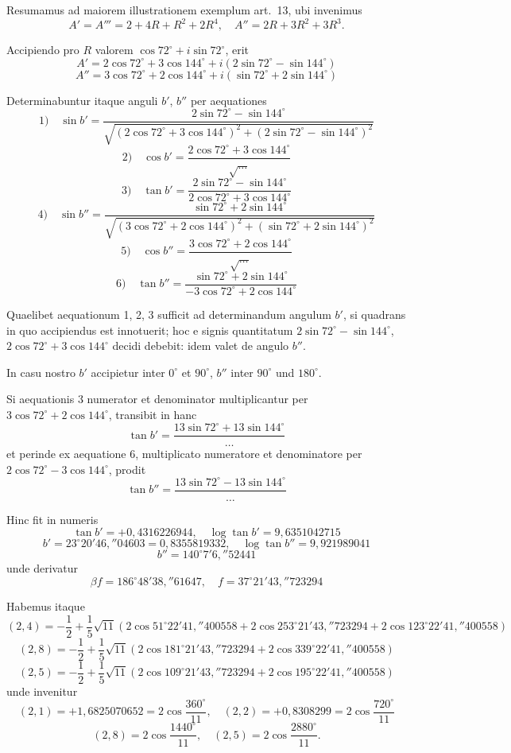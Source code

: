 \documentclass[12pt,a4paper]{article}
\begin{document}
Resumamus ad maiorem illustrationem exemplum art.\ 13, ubi invenimus
\[
A' = A''' = 2 + 4R + R^2 + 2R^4, \quad A'' = 2R + 3R^2 + 3R^3.
\]

Accipiendo pro $R$ valorem $\cos 72^\circ + i\sin 72^\circ$, erit
\[
A' = 2\cos 72^\circ + 3\cos 144^\circ + i(2\sin 72^\circ - \sin 144^\circ)
\]
\[
A'' = 3\cos 72^\circ + 2\cos 144^\circ + i(\sin 72^\circ + 2\sin 144^\circ)
\]

Determinabuntur itaque anguli $b'$, $b''$ per aequationes
\[
1)\quad \sin b' = \frac{2\sin 72^\circ - \sin 144^\circ}{\sqrt{(2\cos 72^\circ + 3\cos 144^\circ)^2 + (2\sin 72^\circ - \sin 144^\circ)^2}}
\]
\[
2)\quad \cos b' = \frac{2\cos 72^\circ + 3\cos 144^\circ}{\sqrt{\ldots}}
\]
\[
3)\quad \tan b' = \frac{2\sin 72^\circ - \sin 144^\circ}{2\cos 72^\circ + 3\cos 144^\circ}
\]
\[
4)\quad \sin b'' = \frac{\sin 72^\circ + 2\sin 144^\circ}{\sqrt{(3\cos 72^\circ + 2\cos 144^\circ)^2 + (\sin 72^\circ + 2\sin 144^\circ)^2}}
\]
\[
5)\quad \cos b'' = \frac{3\cos 72^\circ + 2\cos 144^\circ}{\sqrt{\ldots}}
\]
\[
6)\quad \tan b'' = \frac{\sin 72^\circ + 2\sin 144^\circ}{-3\cos 72^\circ + 2\cos 144^\circ}
\]

Quaelibet aequationum 1, 2, 3 sufficit ad determinandum angulum $b'$, si quadrans in quo accipiendus est innotuerit; hoc e signis quantitatum $2\sin 72^\circ - \sin 144^\circ$, $2\cos 72^\circ + 3\cos 144^\circ$ decidi debebit: idem valet de angulo $b''$.

In casu nostro $b'$ accipietur inter $0^\circ$ et $90^\circ$, $b''$ inter $90^\circ$ und $180^\circ$.

Si aequationis 3 numerator et denominator multiplicantur per $3\cos 72^\circ + 2\cos 144^\circ$, transibit in hanc
\[
\tan b' = \frac{13\sin 72^\circ + 13\sin 144^\circ}{\ldots}
\]
et perinde ex aequatione 6, multiplicato numeratore et denominatore per $2\cos 72^\circ - 3\cos 144^\circ$, prodit
\[
\tan b'' = \frac{13\sin 72^\circ - 13\sin 144^\circ}{\ldots}
\]

Hinc fit in numeris
\[
\tan b' = +0{,}4316226944, \quad \log \tan b' = 9{,}6351042715
\]
\[
b' = 23^\circ 20' 46{,}''04603 = 0{,}8355819332, \quad \log \tan b'' = 9{,}921989041
\]
\[
b'' = 140^\circ 7' 6{,}''52441
\]
unde derivatur
\[
\beta f = 186^\circ 48' 38{,}''61647, \quad f = 37^\circ 21' 43{,}''723294
\]

Habemus itaque
\[
(2,4) = -\frac{1}{2} + \frac{1}{5}\sqrt{11}\left(2\cos 51^\circ 22' 41{,}''400558 + 2\cos 253^\circ 21' 43{,}''723294 + 2\cos 123^\circ 22' 41{,}''400558\right)
\]
\[
(2,8) = -\frac{1}{2} + \frac{1}{5}\sqrt{11}\left(2\cos 181^\circ 21' 43{,}''723294 + 2\cos 339^\circ 22' 41{,}''400558\right)
\]
\[
(2,5) = -\frac{1}{2} + \frac{1}{5}\sqrt{11}\left(2\cos 109^\circ 21' 43{,}''723294 + 2\cos 195^\circ 22' 41{,}''400558\right)
\]
unde invenitur
\[
(2,1) = +1{,}6825070652 = 2\cos\frac{360^\circ}{11}, \quad (2,2) = +0{,}8308299 = 2\cos\frac{720^\circ}{11}
\]
\[
(2,8) = 2\cos\frac{1440^\circ}{11}, \quad (2,5) = 2\cos\frac{2880^\circ}{11}.
\]
\end{document}
